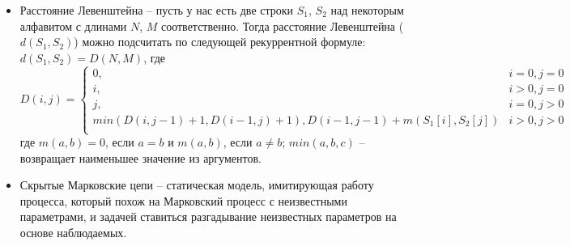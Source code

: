 \begin{itemize}
    \item Расстояние Левенштейна -- пусть у нас есть две строки $S_1$, $S_2$ над некоторым алфавитом с длинами $N$, $M$ соответственно. Тогда расстояние Левенштейна ($d(S_1, S_2)$) можно подсчитать по следующей рекуррентной формуле: $d(S_1, S_2) = D(N, M)$, где
    \begin{equation*}
        D(i, j) = 
        \begin{cases}
            0, & i = 0, j = 0 \\
            i, & i > 0, j = 0 \\
            j, & i = 0, j > 0 \\
            min(D(i, j - 1) + 1, D(i - 1, j) + 1), D(i - 1, j - 1) + m(S_1[i], S_2[j]) & i > 0, j > 0 \\

        \end{cases}
    \end{equation*}
    где $m(a, b) = 0$, если $a = b$ и $m (a, b)$, если $a \not = b$; $min(a, b, c)$ -- возвращает наименьшее значение из аргументов.
    \item Скрытые Марковские цепи -- статическая модель, имитирующая работу процесса, который похож на Марковский процесс с неизвестными параметрами, и задачей ставиться разгадывание неизвестных параметров на основе наблюдаемых.

\end{itemize}